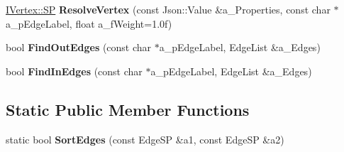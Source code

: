 \begin{DoxyCompactItemize}
\mbox{\label{class_i_graph_1_1_i_vertex_a7c55ee302427e3069e3f708b1ef4ce27}} 
\hyperlink{class_i_graph_1_1_i_vertex_af72b9df91f110bc7824c608c10cc819c}{I\+Vertex\+::\+SP} {\bfseries Resolve\+Vertex} (const Json\+::\+Value \&a\+\_\+\+Properties, const char $\ast$a\+\_\+p\+Edge\+Label, float a\+\_\+f\+Weight=1.\+0f)
\item 
\mbox{\label{class_i_graph_1_1_i_vertex_a7c3e83b576674e139b77bf96b4c508d0}} 
bool {\bfseries Find\+Out\+Edges} (const char $\ast$a\+\_\+p\+Edge\+Label, Edge\+List \&a\+\_\+\+Edges)
\item 
\mbox{\label{class_i_graph_1_1_i_vertex_af2b6512e45673f2259ec35bfed6d27a8}} 
bool {\bfseries Find\+In\+Edges} (const char $\ast$a\+\_\+p\+Edge\+Label, Edge\+List \&a\+\_\+\+Edges)
\end{DoxyCompactItemize}
\subsection*{Static Public Member Functions}
\begin{DoxyCompactItemize}
\item 
\mbox{\label{class_i_graph_1_1_i_vertex_a56519e9e2f5998dcac8dfbc1f736fd77}} 
static bool {\bfseries Sort\+Edges} (const Edge\+SP \&a1, const Edge\+SP \&a2)
\end{DoxyCompactItemize}
